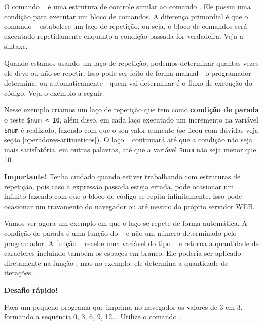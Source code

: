 O comando \comandowhile~ é uma estrutura de controle similar ao comando \comandoif. Ele possui 
uma condição para executar um bloco de comandos. A diferença primordial é que o comando 
\comandowhile~ estabelece um laço de repetição, ou seja, o bloco de comandos será executado 
repetidamente enquanto a condição passada for verdadeira. Veja a sintaxe.



Quando estamos usando um laço de repetição, podemos determinar quantas vezes ele deve 
ou não se repetir. Isso pode ser feito de forma manual - o programador determina, 
ou automaticamente - quem vai determinar é o fluxo de execução do código. Veja o exemplo
a seguir.



Nesse exemplo criamos um laço de repetição que tem como \textbf{condição de parada} o 
teste \texttt{\$num < 10}, além disso, em cada laço executado um incremento 
na variável \texttt{\$num} é realizado, fazendo com que o seu valor aumente 
(se ficou com dúvidas veja seção \ref{operadores-aritmeticos}). O laço 
\comandowhile~ continuará até que a condição não seja mais satisfatória, 
em outras palavras, até que a variável \texttt{\$num} não seja menor que 10.


\begin{framed}
\textbf{{\Large Importante!}}
Tenha cuidado quando estiver trabalhando com estruturas de repetição, pois caso a expressão 
passada esteja errada, pode ocasionar um \lacoloop~ infinito fazendo com que o bloco de 
código se repita infinitamente. Isso pode ocasionar um travamento do navegador ou 
até mesmo do próprio servidor WEB.
\end{framed}

Vamos ver agora um exemplo em que o laço se repete de forma automática. A condição de parada 
é uma função do \php~ e não um número determinado pelo programador. A função \comandostrlen~
recebe uma variável do tipo \tipostring~ e retorna a quantidade de caracteres incluindo 
também os espaços em branco. Ele poderia ser aplicado diretamente na função \funcaoecho, 
mas no exemplo, ele determina a quantidade de iterações. 



\begin{framed}
\textbf{{\Large Desafio rápido!}}

Faça um pequeno programa que imprima no navegador os valores de 3 em 3, formando
a sequência 0, 3, 6, 9, 12... Utilize o comando \comandowhile. 

\end{framed}

